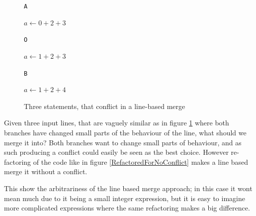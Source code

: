 \documentclass[11pt]{article}
\begin{document}
\begin{figure}

\begin{multicols*}{3}

\texttt{A}

\begin{algorithmic}
	\State $a \gets 0+2+3$
\end{algorithmic}

\columnbreak

\texttt{O}

\begin{algorithmic}
	\State $a \gets 1+2+3$
\end{algorithmic}

\columnbreak

\texttt{B}
 
\begin{algorithmic}
	\State $a \gets 1+2+4$
\end{algorithmic}

\end{multicols*}
\caption{Three statements, that conflict in a line-based merge}
\label{ConflictingLines}

\end{figure}

Given three input lines, that are vaguely similar as in figure \ref{ConflictingLines} where both branches have changed small parts of the behaviour of the line, what should we merge it into? Both branches want to change small parts of behaviour, and as such producing a conflict could easily be seen as the best choice. However re-factoring of the code like in figure \ref{RefactoredForNoConflict} makes a line based merge it without a conflict.

This show the arbitrariness of the line based merge approach; in this case it wont mean much due to it being a small integer expression, but it is easy to imagine more complicated expressions where the same refactoring makes a big difference. 
\end{document}
